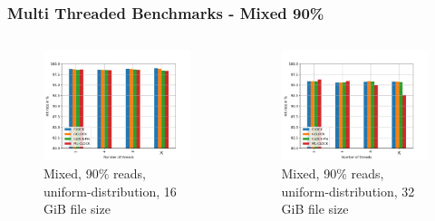 \documentclass[
	aspectratio=169,
	compress,
]{beamer}
\newcommand{\navframetitle}[1]{\frametitle{#1\hfill{\footnotesize\lastsection{}}}}
\begin{document}
\begin{frame}[fragile]
	\navframetitle{Multi Threaded Benchmarks - Mixed 90\%}

	\begin{columns}
		\begin{column}{0.5\textwidth}
			\begin{figure}[ht]
    			\centering
    			\includegraphics[width=\textwidth]{multi_16_gb_rw_90to10_uniform.jpg}
        		\caption{Mixed, 90\% reads, uniform-distribution, 16 GiB file size}
			\end{figure}
		\end{column}
		\begin{column}{0.5\textwidth}
			\begin{figure}[ht]
    			\centering
    			\includegraphics[width=\textwidth]{multi_32_gb_rw_90to10_uniform.jpg}
        		\caption{Mixed, 90\% reads, uniform-distribution, 32 GiB file size}
			\end{figure}			
		\end{column}
	\end{columns}
\end{frame}
\end{document}
